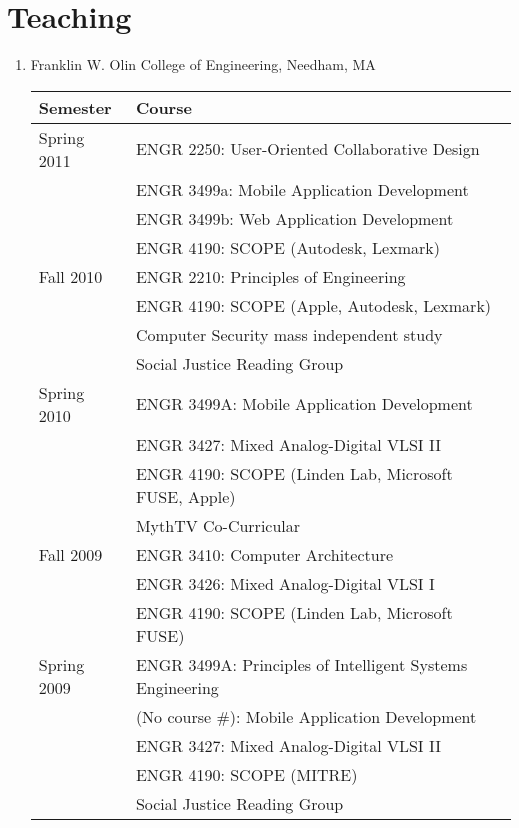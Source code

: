 \documentclass[line]{res}
\begin{document}
\begin{resume}
\begin{enumerate}
	\end{enumerate}
	
	\clearpage
	
	\section{\sc Teaching}
	\begin{enumerate}
		\item Franklin W. Olin College of Engineering, Needham, MA
		\begin{longtable}
			{ |l|l| } \hline \textbf{Semester} & \textbf{Course} \\
			\hline Spring 2011 & ENGR 2250: User-Oriented Collaborative Design\\
			& ENGR 3499a: Mobile Application Development \\
			& ENGR 3499b: Web Application Development \\
			& ENGR 4190: SCOPE (Autodesk, Lexmark) \\
			\hline
			
			Fall 2010 & ENGR 2210: Principles of Engineering\\
			& ENGR 4190: SCOPE (Apple, Autodesk, Lexmark) \\
			& Computer Security mass independent study\\
			& Social Justice Reading Group\\
			\hline
			
			Spring 2010 & ENGR 3499A: Mobile Application Development \\
			& ENGR 3427: Mixed Analog-Digital VLSI II \\
			& ENGR 4190: SCOPE (Linden Lab, Microsoft FUSE, Apple) \\
			& MythTV Co-Curricular \\
			\hline
			
			Fall 2009 & ENGR 3410: Computer Architecture \\
			& ENGR 3426: Mixed Analog-Digital VLSI I \\
			& ENGR 4190: SCOPE (Linden Lab, Microsoft FUSE) \\
			\hline
			
			Spring 2009 & ENGR 3499A: Principles of Intelligent Systems Engineering \\
			& (No course \#): Mobile Application Development \\
			& ENGR 3427: Mixed Analog-Digital VLSI II \\
			& ENGR 4190: SCOPE (MITRE) \\
			& Social Justice Reading Group \\
			\hline
			

\end{longtable}
\end{enumerate}
\end{resume}
\end{document}
